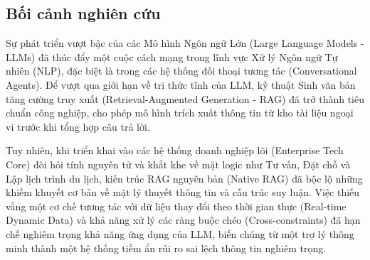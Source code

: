 \subsection{Bối cảnh nghiên cứu}

Sự phát triển vượt bậc của các Mô hình Ngôn ngữ Lớn (Large Language Models - LLMs) đã thúc đẩy một cuộc cách mạng trong lĩnh vực Xử lý Ngôn ngữ Tự nhiên (NLP), đặc biệt là trong các hệ thống đối thoại tương tác (Conversational Agents). Để vượt qua giới hạn về tri thức tĩnh của LLM, kỹ thuật Sinh văn bản tăng cường truy xuất (Retrieval-Augmented Generation - RAG) đã trở thành tiêu chuẩn công nghiệp, cho phép mô hình trích xuất thông tin từ kho tài liệu ngoại vi trước khi tổng hợp câu trả lời.

Tuy nhiên, khi triển khai vào các hệ thống doanh nghiệp lõi (Enterprise Tech Core) đòi hỏi tính nguyên tử và khắt khe về mặt logic như Tư vấn, Đặt chỗ và Lập lịch trình du lịch, kiến trúc RAG nguyên bản (Native RAG) đã bộc lộ những khiếm khuyết cơ bản về mặt lý thuyết thông tin và cấu trúc suy luận. Việc thiếu vắng một cơ chế tương tác với dữ liệu thay đổi theo thời gian thực (Real-time Dynamic Data) và khả năng xử lý các ràng buộc chéo (Cross-constraints) đã hạn chế nghiêm trọng khả năng ứng dụng của LLM, biến chúng từ một trợ lý thông minh thành một hệ thống tiềm ẩn rủi ro sai lệch thông tin nghiêm trọng.

